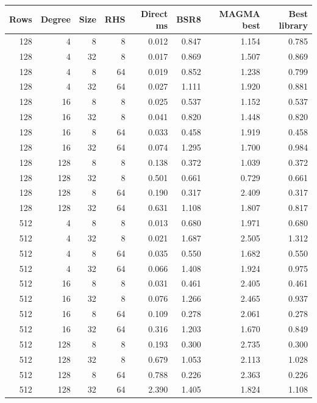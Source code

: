 \begin{tabular}{rrrrrrrr}
\toprule
Rows & Degree & Size & RHS & Direct ms & BSR8 & MAGMA best & Best library\\
\midrule
128 & 4 & 8 & 8 & 0.012 & 0.847 & 1.154 & 0.785\\
128 & 4 & 32 & 8 & 0.017 & 0.869 & 1.507 & 0.869\\
128 & 4 & 8 & 64 & 0.019 & 0.852 & 1.238 & 0.799\\
128 & 4 & 32 & 64 & 0.027 & 1.111 & 1.920 & 0.881\\
128 & 16 & 8 & 8 & 0.025 & 0.537 & 1.152 & 0.537\\
128 & 16 & 32 & 8 & 0.041 & 0.820 & 1.448 & 0.820\\
128 & 16 & 8 & 64 & 0.033 & 0.458 & 1.919 & 0.458\\
128 & 16 & 32 & 64 & 0.074 & 1.295 & 1.700 & 0.984\\
128 & 128 & 8 & 8 & 0.138 & 0.372 & 1.039 & 0.372\\
128 & 128 & 32 & 8 & 0.501 & 0.661 & 0.729 & 0.661\\
128 & 128 & 8 & 64 & 0.190 & 0.317 & 2.409 & 0.317\\
128 & 128 & 32 & 64 & 0.631 & 1.108 & 1.807 & 0.817\\
512 & 4 & 8 & 8 & 0.013 & 0.680 & 1.971 & 0.680\\
512 & 4 & 32 & 8 & 0.021 & 1.687 & 2.505 & 1.312\\
512 & 4 & 8 & 64 & 0.035 & 0.550 & 1.682 & 0.550\\
512 & 4 & 32 & 64 & 0.066 & 1.408 & 1.924 & 0.975\\
512 & 16 & 8 & 8 & 0.031 & 0.461 & 2.405 & 0.461\\
512 & 16 & 32 & 8 & 0.076 & 1.266 & 2.465 & 0.937\\
512 & 16 & 8 & 64 & 0.109 & 0.278 & 2.061 & 0.278\\
512 & 16 & 32 & 64 & 0.316 & 1.203 & 1.670 & 0.849\\
512 & 128 & 8 & 8 & 0.193 & 0.300 & 2.735 & 0.300\\
512 & 128 & 32 & 8 & 0.679 & 1.053 & 2.113 & 1.028\\
512 & 128 & 8 & 64 & 0.788 & 0.226 & 2.363 & 0.226\\
512 & 128 & 32 & 64 & 2.390 & 1.405 & 1.824 & 1.108\\
\bottomrule
\end{tabular}
